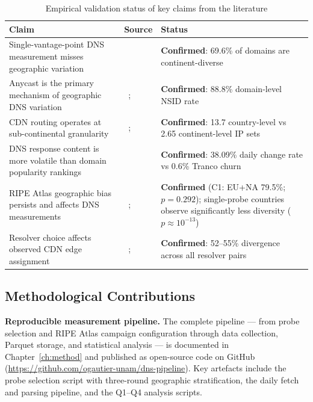 \begin{table}[H]
\centering
\small
\begin{tabularx}{\linewidth}{X p{4.0cm} p{5.5cm}}
\toprule
\textbf{Claim} & \textbf{Source} & \textbf{Status} \\
\midrule
Single-vantage-point \ac{DNS} measurement misses geographic variation & ~\cite{vanRijswijk2016} & \textbf{Confirmed}: 69.6\% of domains are continent-diverse \\
Anycast is the primary mechanism of geographic \ac{DNS} variation & ~\cite{Koch2021}; ~\cite{Bortzmeyer2013} & \textbf{Confirmed}: 88.8\% domain-level \ac{NSID} rate \\
\ac{CDN} routing operates at sub-continental granularity & ~\cite{Hours2016}; ~\cite{Li2025} & \textbf{Confirmed}: 13.7 country-level vs 2.65 continent-level \ac{IP} sets \\
\ac{DNS} response content is more volatile than domain popularity rankings & ~\cite{LePochat2019} & \textbf{Confirmed}: 38.09\% daily change rate vs 0.6\% Tranco churn \\
RIPE Atlas geographic bias persists and affects \ac{DNS} measurements & ~\cite{Bajpai2017}; ~\cite{Nosyk2025} & \textbf{Confirmed} (C1: EU+NA 79.5\%; $p=0.292$); single-probe countries observe significantly less diversity ($p \approx 10^{-13}$) \\
Resolver choice affects observed \ac{CDN} edge assignment & ~\cite{Hours2016}; ~\cite{Wang2018} & \textbf{Confirmed}: 52--55\% divergence across all resolver pairs \\
\bottomrule
\end{tabularx}
\caption{Empirical validation status of key claims from the literature}
\label{tab:hypothesis_validation}
\end{table}

\bigskip
\subsection{Methodological Contributions}
\label{subsec:5.3.2}

\textbf{Reproducible measurement pipeline.} The complete pipeline --- from probe selection and RIPE Atlas campaign configuration through data collection, Parquet storage, and statistical analysis --- is documented in Chapter~\ref{ch:method} and published as open-source code on GitHub (\url{https://github.com/ogautier-unam/dns-pipeline}). Key artefacts include the probe selection script with three-round geographic stratification, the daily fetch and parsing pipeline, and the Q1--Q4 analysis scripts.


